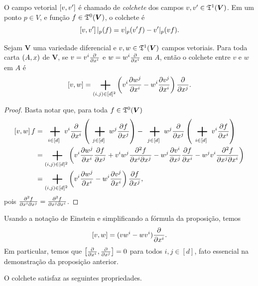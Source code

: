 O campo vetorial $\left[{v},{v'}\right]$ é chamado de \emph{colchete} dos campos $v,v' \in \mathfrak{T}^1(\bm V)$. Em um ponto $p \in V$, e função $f \in \mathfrak{T}^0(\bm V)$, o colchete é
	\begin{equation*}
	\left[{v},{v'}\right]|_p(f) = v|_p(v' f) - v'|_p(v f).
	\end{equation*}

\begin{proposition}
Sejam $\bm V$ uma variedade diferencial e $v,w \in \mathfrak{T}^1(\bm V)$ campos vetoriais. Para toda carta $(A,x)$ de $\bm V$, se $v = v^i \frac{\partial{}}{\partial{x^i}}$ e $w = w^i \frac{\partial{}}{\partial{x^i}}$ em $A$, então o colchete entre $v$ e $w$ em $A$ é
	\begin{equation*}
	\col{v}{w} = \sum_{(i,j) \in [d]^2} \left(v^i\der{w^j}{\x^i} -  w^i\der{v^j}{\x^i}\right) \der{}{\x^j}.
	\end{equation*}
\end{proposition}
\begin{proof}
Basta notar que, para toda $f \in \mathfrak{T}^0(\bm V)$
	\begin{align*}
	\col{v}{w}f &= \sum_{i \in [d]} v^i \der{}{\x^i} \left( \sum_{j \in [d]} w^j \der{f}{\x^j} \right) - \sum_{j \in [d]} w^j \der{}{\x^j} \left( \sum_{i \in [d]} v^i \der{f}{\x^i} \right) \\
		&= \sum_{(i,j) \in [d]^2} \left( v^i \der{w^j}{\x^i}\der{f}{\x^j} + v^iw^j \der{^2 f}{\x^i \partial \x^j} - w^j \der{v^i}{\x^j}\der{f}{\x^i} - w^jv^i \der{^2 f}{\x^j \partial \x^i} \right)\\
		&= \sum_{(i,j) \in [d]^2} \left(v^i\der{w^j}{\x^i} -  w^i\der{v^j}{\x^i}\right) \der{f}{\x^j},
	\end{align*}
pois $\frac{\partial{^2 f}}{\partial{x^i \partial x^j}} = \frac{\partial{^2 f}}{\partial{x^j \partial x^i}}$.
\end{proof}

Usando a notação de Einstein e simplificando a fórmula da proposição, temos
	\begin{equation*}
	\left[{v},{w}\right] = (vw^i - wv^i)\frac{\partial{}}{\partial{x^i}}.
	\end{equation*}
Em particular, temos que $\left[{\frac{\partial{}}{\partial{x^i}}},{\frac{\partial{}}{\partial{x^j}}}\right] = 0$ para todos $i,j \in [d]$, fato essencial na demonstração da proposição anterior.

O colchete satisfaz as seguintes propriedades.

